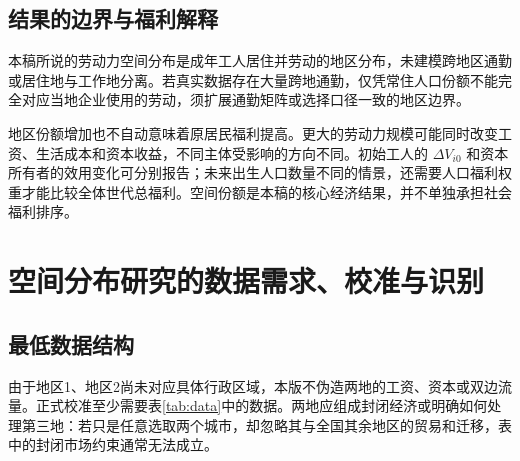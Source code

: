 \documentclass[UTF8,a4paper,zihao=-4,fontset=windows]{ctexart}
\numberwithin{equation}{section}
\begin{document}
\subsection{结果的边界与福利解释}
本稿所说的劳动力空间分布是成年工人居住并劳动的地区分布，未建模跨地区通勤或居住地与工作地分离。若真实数据存在大量跨地通勤，仅凭常住人口份额不能完全对应当地企业使用的劳动，须扩展通勤矩阵或选择口径一致的地区边界。

地区份额增加也不自动意味着原居民福利提高。更大的劳动力规模可能同时改变工资、生活成本和资本收益，不同主体受影响的方向不同。初始工人的 $\Delta V_{i0}$ 和资本所有者的效用变化可分别报告；未来出生人口数量不同的情景，还需要人口福利权重才能比较全体世代总福利。空间份额是本稿的核心经济结果，并不单独承担社会福利排序。

\section{空间分布研究的数据需求、校准与识别}
\label{sec:data}

\subsection{最低数据结构}
由于地区1、地区2尚未对应具体行政区域，本版不伪造两地的工资、资本或双边流量。正式校准至少需要表\ref{tab:data}中的数据。两地应组成封闭经济或明确如何处理第三地：若只是任意选取两个城市，却忽略其与全国其余地区的贸易和迁移，表中的封闭市场约束通常无法成立。
\end{document}
